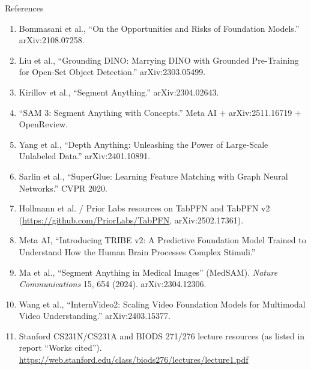 \begin{frame}{References}
  \footnotesize
  \begin{enumerate}
    \item Bommasani et al., ``On the Opportunities and Risks of Foundation Models.'' arXiv:2108.07258.
    \item Liu et al., ``Grounding DINO: Marrying DINO with Grounded Pre-Training for Open-Set Object Detection.'' arXiv:2303.05499.
    \item Kirillov et al., ``Segment Anything.'' arXiv:2304.02643.
    \item ``SAM 3: Segment Anything with Concepts.'' Meta AI + arXiv:2511.16719 + OpenReview.
    \item Yang et al., ``Depth Anything: Unleashing the Power of Large-Scale Unlabeled Data.'' arXiv:2401.10891.
    \item Sarlin et al., ``SuperGlue: Learning Feature Matching with Graph Neural Networks.'' CVPR 2020.
    \item Hollmann et al. / Prior Labs resources on TabPFN and TabPFN v2 (\url{https://github.com/PriorLabs/TabPFN}, arXiv:2502.17361).
    \item Meta AI, ``Introducing TRIBE v2: A Predictive Foundation Model Trained to Understand How the Human Brain Processes Complex Stimuli.'' 
    \item Ma et al., ``Segment Anything in Medical Images'' (MedSAM). \emph{Nature Communications} 15, 654 (2024). arXiv:2304.12306.
    \item Wang et al., ``InternVideo2: Scaling Video Foundation Models for Multimodal Video Understanding.'' arXiv:2403.15377.
    \item Stanford CS231N/CS231A and BIODS 271/276 lecture resources (as listed in report ``Works cited'').\\
    \url{https://web.stanford.edu/class/biods276/lectures/lecture1.pdf}
  \end{enumerate}
\end{frame}

